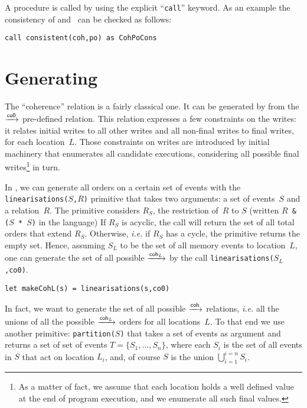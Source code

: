 \documentclass[a4paper]{article}
\begin{document}
A procedure is called by using the explicit ``\texttt{call}'' keyword.
As an example the consistency of \coh{} and~\po{} can be checked as follows:
\begin{verbatim}
call consistent(coh,po) as CohPoCons
\end{verbatim}


\section{\label{coh}Generating \coh}

The ``coherence'' relation is a fairly classical one.
It can be generated by \herd{} from the $\xrightarrow{\textsf{\scriptsize{}co0}}$ pre-defined relation.
This relation expresses a few constraints on the writes:
it relates initial writes to all other writes and
all non-final writes to final writes, for each  location~$L$.
Those constraints on writes are introduced by \herd{} initial machinery
that enumerates all candidate executions, considering all possible
final writes\footnote{As a matter of fact, we assume that each location
holds a well defined value at the end of program execution, and we
enumerate all such final values.} in turn.

In \herd{}, we can generate all orders on a certain set of events with the
\texttt{linearisations($S$,$R$)} primitive that takes two arguments:
a set of events~$S$ and a relation~$R$.
The primitive considers $R_S$, the restriction of~$R$ to $S$ (written
\texttt{$R$ \& ($S$ * $S$)} in the \cat{} language)
If $R_S$ is acyclic, the call will return the set of all total orders
that extend $R_S$. Otherwise, \emph{i.e.} if $R_S$ has a cycle,
the primitive returns the empty set.
Hence, assuming $S_L$ to be the set of all memory events to location~$L$,
one can generate the set of all possible $\xrightarrow{\textsf{\scriptsize{}coh$_{L}$}}$ by the call
\texttt{linearisations($S_L$,co0)}.
\begin{verbatim}
let makeCohL(s) = linearisations(s,co0)
\end{verbatim}

In fact, we want to generate the set of all possible $\xrightarrow{\textsf{\scriptsize{}coh}}$ relations,
\emph{i.e.} all the unions of all the possible $\xrightarrow{\textsf{\scriptsize{}coh$_{L}$}}$ orders for all
locations~$L$. To that end we use another \cat{} primitive:
\texttt{partition($S$)} that takes a set of events as argument and
returns a set of set of events $T = \{S_1,\ldots,S_n\}$, where each
$S_i$ is the set of all events in $S$ that act on location $L_i$,
and, of course $S$ is the union $\bigcup_{i=1}^{i=n} S_i$.
\end{document}
